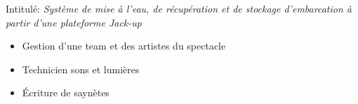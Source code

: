 \documentclass[10pt,a4paper]{../altacv}
\begin{document}
Intitulé: \emph{Système de mise à l’eau, de récupération et de stockage d’embarcation à partir d’une plateforme Jack-up}

\divider

\begin{itemize}[leftmargin=7mm]
  \item Gestion d'une team et des artistes du spectacle
  \item Technicien sons et lumières
  \item Écriture de saynètes
\end{itemize}






\end{document}
